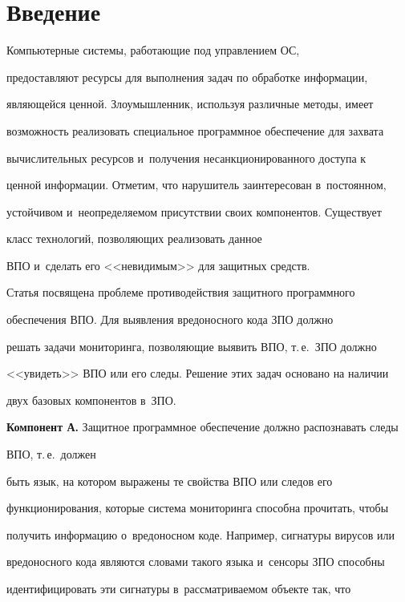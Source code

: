 \section{Введение}





  Компьютерные системы, работающие под управлением ОС, 


предоставляют ресурсы для выполнения задач по обработке информации, 


являющейся ценной. Злоумышленник, используя различные методы, имеет 


возможность реализовать специальное программное обеспечение для захвата 


вычислительных ресурсов и~получения несанкционированного доступа к 


ценной информации. Отметим, что нарушитель заинтересован в~постоянном, 


устойчивом и~неопределяемом присутствии своих компонентов. Существует 


класс технологий, позволяющих реализовать данное 


ВПО и~сделать его <<невидимым>> для защитных средств.


  


  Статья посвящена проблеме противодействия защитного программного 


обеспечения ВПО. Для выявления вредоносного кода ЗПО должно 


решать задачи мониторинга, позволяющие выявить ВПО, т.\,е.\ ЗПО должно 


<<увидеть>> ВПО или его следы. Решение этих задач основано на наличии 


двух базовых компонентов в~ЗПО. 


  


  \textbf{Компонент А.} Защитное программное обеспечение должно распознавать следы 


  ВПО, т.\,е.\ должен 


быть язык, на котором выражены те свойства ВПО или следов его 


функционирования, которые система мониторинга способна прочитать, чтобы 


получить информацию о~вредоносном коде. Например, сигнатуры вирусов или 


вредоносного кода являются словами такого языка и~сенсоры ЗПО способны 


идентифицировать эти сигнатуры в~рассматриваемом объекте так, что 



